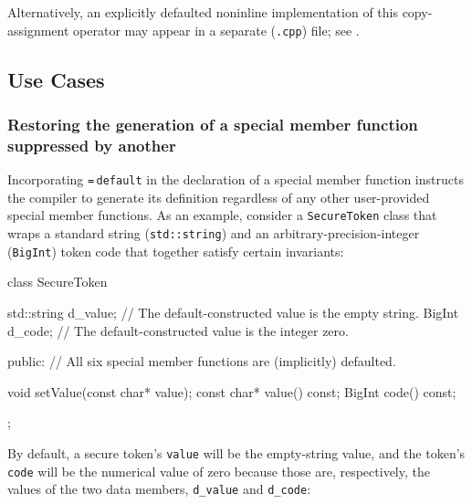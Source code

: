 \noindent Alternatively, an explicitly defaulted noninline implementation of this
copy-assignment operator may appear in a separate (\lstinline!.cpp!) file;
see .

\subsection[Use Cases]{Use Cases}\label{default-use-cases}

\subsubsection[Restoring the generation of a special member function suppressed by another]{Restoring the generation of a special member function suppressed by another}\label{restoring-the-generation-of-a-special-member-function-suppressed-by-another}

Incorporating \lstinline!=!\,\lstinline!default! in the declaration of a
special member function instructs the compiler to generate its
definition regardless of any other user-provided special member
functions. As an example, consider a 
\lstinline!SecureToken! class that wraps a standard string
(\lstinline!std::string!) and an arbitrary-precision-integer
(\lstinline!BigInt!) token code that together satisfy certain invariants:

\begin{emcppslisting}[language=C++]
class SecureToken
{
    std::string d_value;  // The default-constructed value is the empty string.
    BigInt      d_code;   // The default-constructed value is the integer zero.

public:
    // All six special member functions are (implicitly) defaulted.

    void setValue(const char* value);
    const char* value() const;
    BigInt code() const;
};
\end{emcppslisting}
    
\noindent By default, a secure token's \lstinline!value! will be the empty-string
value, and the token's \lstinline!code! will be the numerical value of zero
because those are, respectively, the  values
of the two data members, \lstinline!d_value! and \lstinline!d_code!:

